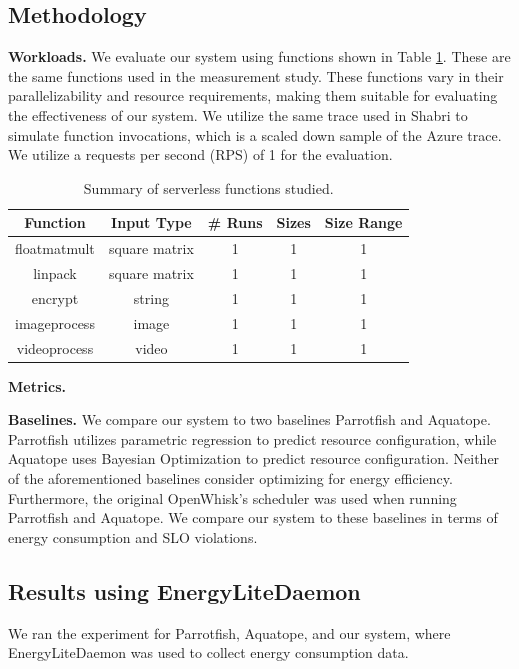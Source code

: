 \documentclass[times, 10pt,twocolumn]{article}
\begin{document}
\subsection{Methodology}
\textbf{Workloads.} We evaluate our system using functions shown in Table \ref{tab:summary_of_serverless_functions}. These are the same functions used in the measurement study. These functions vary in their parallelizability and resource requirements, making them suitable for evaluating the effectiveness of our system. We utilize the same trace used in Shabri \cite{sinha2024shabari} to simulate function invocations, which is a scaled down sample of the Azure trace. We utilize a requests per second (RPS) of 1 for the evaluation.

\begin{table}[htbp]
  \centering
  \begin{tabular}{|c|c|c|c|c|}
  \hline
  \textbf{Function} & \textbf{Input Type} & \textbf{\# Runs} & \textbf{Sizes} & \textbf{Size Range} \\ \hline
  floatmatmult & square matrix & 1 & 1 & 1 \\ \hline
  linpack & square matrix & 1 & 1 & 1 \\ \hline
  encrypt & string & 1 & 1 & 1 \\ \hline
  imageprocess & image & 1 & 1 & 1 \\ \hline
  videoprocess & video & 1 & 1 & 1 \\ \hline
  \end{tabular}
  \caption{Summary of serverless functions studied.}
  \label{tab:summary_of_serverless_functions}
\end{table}

\textbf{Metrics.}

\textbf{Baselines.} We compare our system to two baselines Parrotfish and Aquatope. Parrotfish \cite{parrotfish} utilizes parametric regression to predict resource configuration, while Aquatope \cite{aquatope} uses Bayesian Optimization to predict resource configuration. Neither of the aforementioned baselines consider optimizing for energy efficiency. Furthermore, the original OpenWhisk's scheduler was used when running Parrotfish and Aquatope. We compare our system to these baselines in terms of energy consumption and SLO violations.

\subsection{Results using EnergyLiteDaemon}
We ran the experiment for Parrotfish, Aquatope, and our system, where EnergyLiteDaemon was used to collect energy consumption data.
\end{document}
